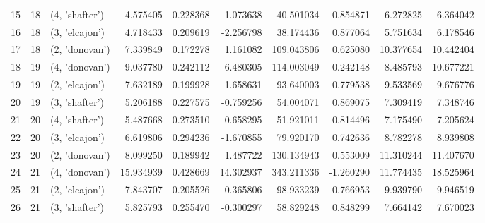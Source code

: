 \begin{tabular}{lrlrrrrrrr}
15 &     18 &  (4, 'shafter') &   4.575405 &  0.228368 &   1.073638 &   40.501034 &  0.854871 &   6.272825 &   6.364042 \\
16 &     18 &  (3, 'elcajon') &   4.718433 &  0.209619 &  -2.256798 &   38.174436 &  0.877064 &   5.751634 &   6.178546 \\
17 &     18 &  (2, 'donovan') &   7.339849 &  0.172278 &   1.161082 &  109.043806 &  0.625080 &  10.377654 &  10.442404 \\
18 &     19 &  (4, 'donovan') &   9.037780 &  0.242112 &   6.480305 &  114.003049 &  0.242148 &   8.485793 &  10.677221 \\
19 &     19 &  (2, 'elcajon') &   7.632189 &  0.199928 &   1.658631 &   93.640003 &  0.779538 &   9.533569 &   9.676776 \\
20 &     19 &  (3, 'shafter') &   5.206188 &  0.227575 &  -0.759256 &   54.004071 &  0.869075 &   7.309419 &   7.348746 \\
21 &     20 &  (4, 'shafter') &   5.487668 &  0.273510 &   0.658295 &   51.921011 &  0.814496 &   7.175490 &   7.205624 \\
22 &     20 &  (3, 'elcajon') &   6.619806 &  0.294236 &  -1.670855 &   79.920170 &  0.742636 &   8.782278 &   8.939808 \\
23 &     20 &  (2, 'donovan') &   8.099250 &  0.189942 &   1.487722 &  130.134943 &  0.553009 &  11.310244 &  11.407670 \\
24 &     21 &  (4, 'donovan') &  15.934939 &  0.428669 &  14.302937 &  343.211336 & -1.260290 &  11.774435 &  18.525964 \\
25 &     21 &  (2, 'elcajon') &   7.843707 &  0.205526 &   0.365806 &   98.933239 &  0.766953 &   9.939790 &   9.946519 \\
26 &     21 &  (3, 'shafter') &   5.825793 &  0.255470 &  -0.300297 &   58.829248 &  0.848299 &   7.664142 &   7.670023 \\
\bottomrule
\end{tabular}
